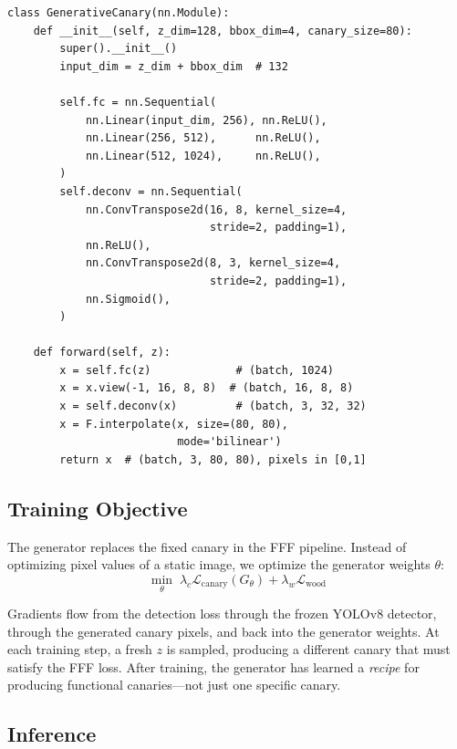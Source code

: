 \documentclass[11pt,a4paper]{article}
\begin{document}
\begin{lstlisting}[caption={GenerativeCanary architecture ($\sim$693K parameters).}]
class GenerativeCanary(nn.Module):
    def __init__(self, z_dim=128, bbox_dim=4, canary_size=80):
        super().__init__()
        input_dim = z_dim + bbox_dim  # 132

        self.fc = nn.Sequential(
            nn.Linear(input_dim, 256), nn.ReLU(),
            nn.Linear(256, 512),      nn.ReLU(),
            nn.Linear(512, 1024),     nn.ReLU(),
        )
        self.deconv = nn.Sequential(
            nn.ConvTranspose2d(16, 8, kernel_size=4,
                               stride=2, padding=1),
            nn.ReLU(),
            nn.ConvTranspose2d(8, 3, kernel_size=4,
                               stride=2, padding=1),
            nn.Sigmoid(),
        )

    def forward(self, z):
        x = self.fc(z)             # (batch, 1024)
        x = x.view(-1, 16, 8, 8)  # (batch, 16, 8, 8)
        x = self.deconv(x)         # (batch, 3, 32, 32)
        x = F.interpolate(x, size=(80, 80),
                          mode='bilinear')
        return x  # (batch, 3, 80, 80), pixels in [0,1]
\end{lstlisting}

\subsection{Training Objective}

The generator replaces the fixed canary in the FFF pipeline. Instead of optimizing pixel values of a static image, we optimize the generator weights $\theta$:
\begin{equation}
    \min_\theta \; \lambda_c \mathcal{L}_{\text{canary}}(G_\theta) + \lambda_w \mathcal{L}_{\text{wood}}
\end{equation}

Gradients flow from the detection loss through the frozen YOLOv8 detector, through the generated canary pixels, and back into the generator weights. At each training step, a fresh $z$ is sampled, producing a different canary that must satisfy the FFF loss. After training, the generator has learned a \textit{recipe} for producing functional canaries---not just one specific canary.

\subsection{Inference}
\end{document}
